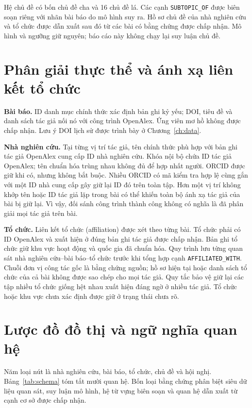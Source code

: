 Hệ chủ đề có bốn chủ đề cha và 16 chủ đề lá. Các cạnh \texttt{SUBTOPIC\_OF}
được biên soạn riêng với nhãn bài báo do mô hình suy ra. Hồ sơ chủ đề của nhà
nghiên cứu và tổ chức được dẫn xuất sau đó từ các bài có bằng chứng được chấp
nhận. Mô hình và ngưỡng giữ nguyên; báo cáo này không chạy lại suy luận chủ đề.

\section{Phân giải thực thể và ánh xạ liên kết tổ chức}
\textbf{Bài báo.} ID danh mục chính thức xác định bản ghi kỷ yếu; DOI, tiêu đề
và danh sách tác giả nối nó với công trình OpenAlex. Ứng viên mơ hồ không được
chấp nhận. Lưu ý DOI lịch sử được trình bày ở Chương~\ref{ch:data}.

\textbf{Nhà nghiên cứu.} Tại từng vị trí tác giả, tên chính thức phù hợp với
bản ghi tác giả OpenAlex cung cấp ID nhà nghiên cứu. Khóa nội bộ chứa ID tác
giả OpenAlex; tên chuẩn hóa trùng nhau không đủ để hợp nhất người. ORCID được
giữ khi có, nhưng không bắt buộc. Nhiều ORCID có mã kiểm tra hợp lệ cùng gắn
với một ID nhà cung cấp gây giữ lại ID đó trên toàn tập. Hơn một vị trí không
khớp tên hoặc ID tác giả lặp trong bài có thể khiến toàn bộ ánh xạ tác giả của
bài bị giữ lại. Vì vậy, đối sánh công trình thành công không có nghĩa là đã
phân giải mọi tác giả trên bài.

\textbf{Tổ chức.} Liên kết tổ chức (affiliation) được xét theo từng bài. Tổ chức phải có ID OpenAlex và xuất hiện ở đúng bản ghi tác
giả được chấp nhận. Bản ghi tổ chức giữ khu vực hoạt động và quốc gia đã chuẩn
hóa. Quy trình lưu từng quan sát nhà nghiên cứu--bài báo--tổ chức trước khi tổng
hợp cạnh \texttt{AFFILIATED\_WITH}. Chuỗi đơn vị công tác gốc là bằng chứng
nguồn; hồ sơ hiện tại hoặc danh sách tổ chức của cả bài không được sao chép cho
mọi tác giả. Quy tắc bảo vệ giữ lại các tập nhiều tổ chức giống hệt nhau xuất
hiện đáng ngờ ở nhiều tác giả. Tổ chức hoặc khu vực chưa xác định được giữ ở
trạng thái chưa rõ.

\section{Lược đồ đồ thị và ngữ nghĩa quan hệ}
Năm loại nút là nhà nghiên cứu, bài báo, tổ chức, chủ đề và hội nghị.
Bảng~\ref{tab:schema} tóm tắt mười quan hệ. Bốn loại bằng chứng phân biệt siêu
dữ liệu quan sát, suy luận mô hình, hệ từ vựng biên soạn và quan hệ dẫn xuất từ
cạnh cơ sở được chấp nhận.

